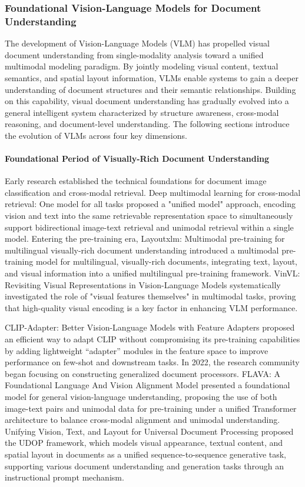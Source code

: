 \subsubsection{Foundational Vision-Language Models for Document Understanding}
The development of Vision-Language Models (VLM) has propelled visual document understanding from single-modality analysis toward a unified multimodal modeling paradigm. By jointly modeling visual content, textual semantics, and spatial layout information, VLMs enable systems to gain a deeper understanding of document structures and their semantic relationships. Building on this capability, visual document understanding has gradually evolved into a general intelligent system characterized by structure awareness, cross-modal reasoning, and document-level understanding. The following sections introduce the evolution of VLMs across four key dimensions.

\paragraph{Foundational Period of Visually-Rich Document Understanding}
Early research established the technical foundations for document image classification and cross-modal retrieval. Deep multimodal learning for cross-modal retrieval: One model for all tasks \cite{wei2020deep} proposed a "unified model" approach, encoding vision and text into the same retrievable representation space to simultaneously support bidirectional image-text retrieval and unimodal retrieval within a single model. Entering the pre-training era, Layoutxlm: Multimodal pre-training for multilingual visually-rich document understanding \cite{xu2021layoutxlm} introduced a multimodal pre-training model for multilingual, visually-rich documents, integrating text, layout, and visual information into a unified multilingual pre-training framework. VinVL: Revisiting Visual Representations in Vision-Language Models \cite{zhang2021vinvl} systematically investigated the role of "visual features themselves" in multimodal tasks, proving that high-quality visual encoding is a key factor in enhancing VLM performance.

CLIP-Adapter: Better Vision-Language Models with Feature Adapters \cite{gao2021clipadapter} proposed an efficient way to adapt CLIP without compromising its pre-training capabilities by adding lightweight ``adapter'' modules in the feature space to improve performance on few-shot and downstream tasks. In 2022, the research community began focusing on constructing generalized document processors. FLAVA: A Foundational Language And Vision Alignment Model \cite{singh2022flava} presented a foundational model for general vision-language understanding, proposing the use of both image-text pairs and unimodal data for pre-training under a unified Transformer architecture to balance cross-modal alignment and unimodal understanding. Unifying Vision, Text, and Layout for Universal Document Processing \cite{li2022udop} proposed the UDOP framework, which models visual appearance, textual content, and spatial layout in documents as a unified sequence-to-sequence generative task, supporting various document understanding and generation tasks through an instructional prompt mechanism.

